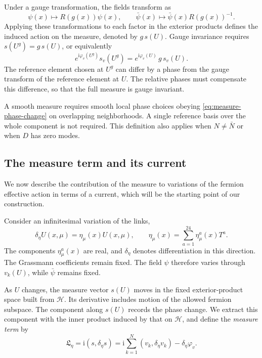 \documentclass[11pt,a4paper]{article}
\theoremstyle{remark}
\newcommand{\ii}{\mathrm i}
\begin{document}
Under a gauge transformation, the fields transform as
\begin{equation}
 \psi(x)\mapsto R(g(x))\psi(x),\qquad
 \bar\psi(x)\mapsto\bar\psi(x)R(g(x))^{-1}.
\end{equation}
Applying these transformations to each factor in the
exterior products defines the induced action on the
measure, denoted by \(g\,s(U)\).
Gauge invariance requires \(s(U^g)=g\,s(U)\), or
equivalently
\begin{equation}
 e^{\ii\varphi_v(U^g)}s_v(U^g)
 =e^{\ii\varphi_v(U)}\,g\,s_v(U).
\end{equation}
The reference element chosen at \(U^g\) can differ by a
phase from the gauge transform of the reference element
at \(U\). The relative phases must compensate this
difference, so that the full measure is gauge invariant.

A smooth measure requires smooth local phase choices
obeying \eqref{eq:measure-phase-change} on overlapping
neighborhoods. A single reference basis over the whole
component is not required. This definition also applies
when \(N\ne\bar N\) or when \(D\) has zero modes.

\subsection{The measure term and its current}

We now describe the contribution of the measure to variations
of the fermion effective action in terms of a current, which
will be the starting point of our construction.

Consider an infinitesimal variation of the links,
\begin{equation}
 \delta_\eta U(x,\mu)=\eta_\mu(x)U(x,\mu),\qquad
 \eta_\mu(x)=\sum_{a=1}^{24}\eta_\mu^a(x)T^a.
 \label{eq:link-variation}
\end{equation}
The components \(\eta_\mu^a(x)\) are real, and
\(\delta_\eta\) denotes differentiation in this direction.
The Grassmann coefficients remain fixed. The field \(\psi\)
therefore varies through \(v_k(U)\), while \(\bar\psi\) remains fixed.

As \(U\) changes, the measure vector \(s(U)\) moves in the
fixed exterior-product space built from \(\mathcal H\).
Its derivative includes motion of the allowed fermion subspace.
The component along \(s(U)\) records the phase change. We extract
this component with the inner product induced by that on
\(\mathcal H\), and define the \emph{measure term} by
\begin{equation}
 \mathfrak L_\eta
 =\ii(s,\delta_\eta s)
 =\ii\sum_{k=1}^N(v_k,\delta_\eta v_k)
                   -\delta_\eta\varphi_v.
 \label{eq:measure-basis}
\end{equation}
\end{document}
